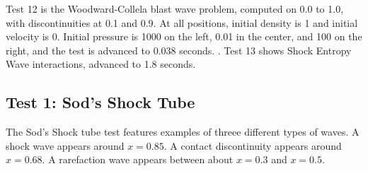 \documentclass[10pt]{article}
\begin{document}
Test 12 is the Woodward-Collela blast wave problem, computed on 0.0 to 1.0, with discontinuities at 0.1 and 0.9. At all positions, initial density is 1 and initial velocity is 0. Initial pressure is 1000 on the left, 0.01 in the center, and 100 on the right, and the test is advanced to 0.038 seconds. \citep{LiskaWendroff2003}. Test 13 shows Shock Entropy Wave interactions, advanced to 1.8 seconds.
\subsection{Test 1: Sod's Shock Tube} 
The Sod's Shock tube test features examples of threee different types of waves. A shock wave appears around $x=0.85$. A contact discontinuity appears around $x=0.68$. A rarefaction wave appears between about $x=0.3$ and $x=0.5$. 
\end{document}
